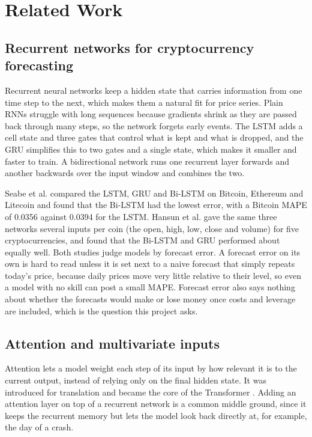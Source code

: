 \section{Related Work}\label{sec:related}

\subsection{Recurrent networks for cryptocurrency forecasting}

Recurrent neural networks keep a hidden state that carries information from one time step to the next, which makes them a natural fit for price series. Plain RNNs struggle with long sequences because gradients shrink as they are passed back through many steps, so the network forgets early events. The LSTM \cite{hochreiter1997} adds a cell state and three gates that control what is kept and what is dropped, and the GRU \cite{cho2014} simplifies this to two gates and a single state, which makes it smaller and faster to train. A bidirectional network \cite{schuster1997} runs one recurrent layer forwards and another backwards over the input window and combines the two.

Seabe et al. \cite{seabe2023} compared the LSTM, GRU and Bi-LSTM on Bitcoin, Ethereum and Litecoin and found that the Bi-LSTM had the lowest error, with a Bitcoin MAPE of 0.0356 against 0.0394 for the LSTM. Hansun et al. \cite{hansun2022} gave the same three networks several inputs per coin (the open, high, low, close and volume) for five cryptocurrencies, and found that the Bi-LSTM and GRU performed about equally well. Both studies judge models by forecast error. A forecast error on its own is hard to read unless it is set next to a naive forecast that simply repeats today's price, because daily prices move very little relative to their level, so even a model with no skill can post a small MAPE. Forecast error also says nothing about whether the forecasts would make or lose money once costs and leverage are included, which is the question this project asks.

\subsection{Attention and multivariate inputs}

Attention lets a model weight each step of its input by how relevant it is to the current output, instead of relying only on the final hidden state. It was introduced for translation \cite{bahdanau2015} and became the core of the Transformer \cite{vaswani2017}. Adding an attention layer on top of a recurrent network is a common middle ground, since it keeps the recurrent memory but lets the model look back directly at, for example, the day of a crash.

